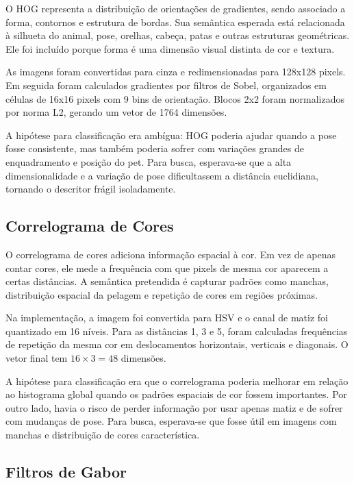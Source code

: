 \documentclass[12pt,a4paper]{article}
\begin{document}
O HOG representa a distribuição de orientações de gradientes, sendo associado a forma, contornos e estrutura de bordas. Sua semântica esperada está relacionada à silhueta do animal, pose, orelhas, cabeça, patas e outras estruturas geométricas. Ele foi incluído porque forma é uma dimensão visual distinta de cor e textura.

As imagens foram convertidas para cinza e redimensionadas para 128x128 pixels. Em seguida foram calculados gradientes por filtros de Sobel, organizados em células de 16x16 pixels com 9 bins de orientação. Blocos 2x2 foram normalizados por norma L2, gerando um vetor de 1764 dimensões.

A hipótese para classificação era ambígua: HOG poderia ajudar quando a pose fosse consistente, mas também poderia sofrer com variações grandes de enquadramento e posição do pet. Para busca, esperava-se que a alta dimensionalidade e a variação de pose dificultassem a distância euclidiana, tornando o descritor frágil isoladamente.

\subsection{Correlograma de Cores}

O correlograma de cores adiciona informação espacial à cor. Em vez de apenas contar cores, ele mede a frequência com que pixels de mesma cor aparecem a certas distâncias. A semântica pretendida é capturar padrões como manchas, distribuição espacial da pelagem e repetição de cores em regiões próximas.

Na implementação, a imagem foi convertida para HSV e o canal de matiz foi quantizado em 16 níveis. Para as distâncias 1, 3 e 5, foram calculadas frequências de repetição da mesma cor em deslocamentos horizontais, verticais e diagonais. O vetor final tem \(16 \times 3 = 48\) dimensões.

A hipótese para classificação era que o correlograma poderia melhorar em relação ao histograma global quando os padrões espaciais de cor fossem importantes. Por outro lado, havia o risco de perder informação por usar apenas matiz e de sofrer com mudanças de pose. Para busca, esperava-se que fosse útil em imagens com manchas e distribuição de cores característica.

\subsection{Filtros de Gabor}
\end{document}
